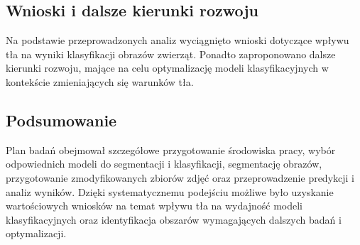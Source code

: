 \subsection*{Wnioski i dalsze kierunki rozwoju}

Na podstawie przeprowadzonych analiz wyciągnięto wnioski dotyczące wpływu tła na wyniki klasyfikacji obrazów zwierząt. Ponadto zaproponowano dalsze kierunki rozwoju, mające na celu optymalizację modeli klasyfikacyjnych w kontekście zmieniających się warunków tła.

\subsection*{Podsumowanie}

Plan badań obejmował szczegółowe przygotowanie środowiska pracy, wybór odpowiednich modeli do segmentacji i klasyfikacji, segmentację obrazów, przygotowanie zmodyfikowanych zbiorów zdjęć oraz przeprowadzenie predykcji i analiz wyników. Dzięki systematycznemu podejściu możliwe było uzyskanie wartościowych wniosków na temat wpływu tła na wydajność modeli klasyfikacyjnych oraz identyfikacja obszarów wymagających dalszych badań i optymalizacji.
